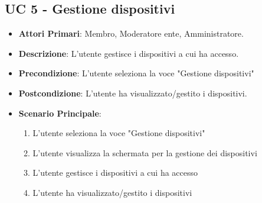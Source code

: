 	\subsection{UC 5 - Gestione dispositivi}
		
		
		\begin{itemize}
			\item \textbf{Attori Primari}: Membro, Moderatore ente, Amministratore.
			\item \textbf{Descrizione}: L'utente gestisce i dispositivi a cui ha accesso.
			\item \textbf{Precondizione}: L'utente seleziona la voce "Gestione dispositivi"
			\item \textbf{Postcondizione}: L'utente ha visualizzato/gestito i dispositivi.
			\item \textbf{Scenario Principale}:
			\begin{enumerate}
				\item{L'utente seleziona la voce "Gestione dispositivi"}
				\item{L'utente visualizza la schermata per la gestione dei dispositivi}
				\item{L'utente gestisce i dispositivi a cui ha accesso}
				\item{L'utente ha visualizzato/gestito i dispositivi}
			\end{enumerate}
		\end{itemize}
			
